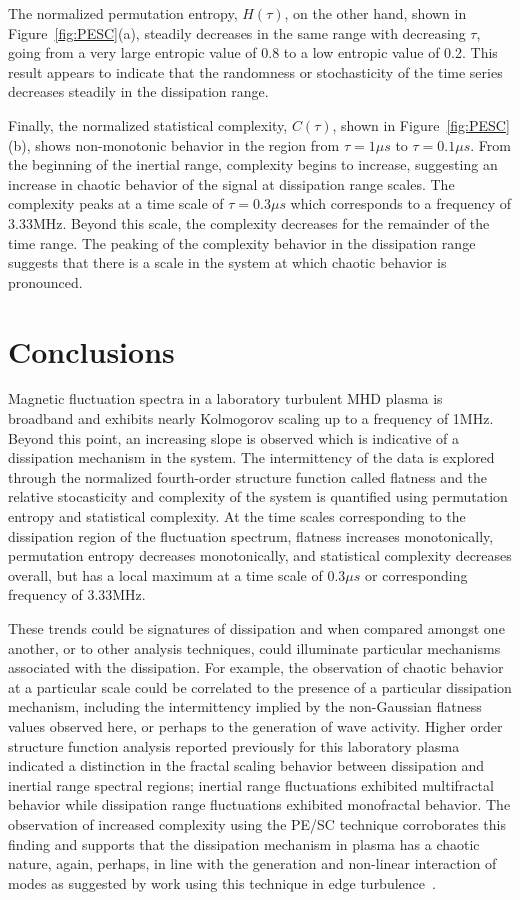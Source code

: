 \documentclass[aip,pop,amsmath,amssymb,preprint,superscriptaddress]{revtex4-1} %
\begin{document}
The normalized permutation entropy, $H(\tau)$, on the other hand, shown in Figure~\ref{fig:PESC}(a), steadily decreases in the same range with decreasing $\tau$, going from a very large entropic value of 0.8 to a low entropic value of 0.2. This result appears to indicate that the randomness or stochasticity of the time series decreases steadily in the dissipation range.

Finally, the normalized statistical complexity, $C(\tau)$, shown in Figure~\ref{fig:PESC}(b), shows non-monotonic behavior in the region from $\tau = 1\mu s$ to $\tau = 0.1\mu s$. From the beginning of the inertial range, complexity begins to increase, suggesting an increase in chaotic behavior of the signal at dissipation range scales. The complexity peaks at a time scale of $\tau = 0.3\mu s$ which corresponds to a frequency of 3.33MHz. Beyond this scale, the complexity decreases for the remainder of the time range. The peaking of the complexity behavior in the dissipation range suggests that there is a scale in the system at which chaotic behavior is pronounced.

\section{Conclusions}

Magnetic fluctuation spectra in a laboratory turbulent MHD plasma is broadband and exhibits nearly Kolmogorov scaling up to a frequency of 1MHz. Beyond this point, an increasing slope is observed which is indicative of a dissipation mechanism in the system. The intermittency of the data is explored through the normalized fourth-order structure function called flatness and the relative stocasticity and complexity of the system is quantified using permutation entropy and statistical complexity. At the time scales corresponding to the dissipation region of the fluctuation spectrum, flatness increases monotonically, permutation entropy decreases monotonically, and statistical complexity decreases overall, but has a local maximum at a time scale of $0.3\mu s$ or corresponding frequency of 3.33MHz. 

These trends could be signatures of dissipation and when compared amongst one another, or to other analysis techniques, could illuminate particular mechanisms associated with the dissipation. For example, the observation of chaotic behavior at a particular scale could be correlated to the presence of a particular dissipation mechanism, including the intermittency implied by the non-Gaussian flatness values observed here, or perhaps to the generation of wave activity. Higher order structure function analysis reported previously for this laboratory plasma~\cite{schaffner2015} indicated a distinction in the fractal scaling behavior between dissipation and inertial range spectral regions; inertial range fluctuations exhibited multifractal behavior while dissipation range fluctuations exhibited monofractal behavior. The observation of increased complexity using the PE/SC technique corroborates this finding and supports that the dissipation mechanism in plasma has a chaotic nature, again, perhaps, in line with the generation and non-linear interaction of modes as suggested by work using this technique in edge turbulence~\cite{maggs2013}.
\end{document}
